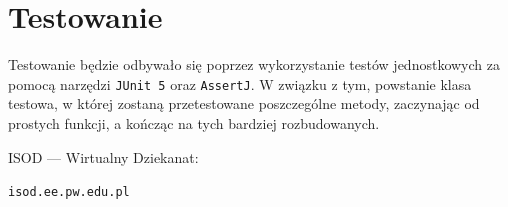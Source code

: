 \documentclass[12pt,a4paper]{article}
\begin{document}
\newpage
\section{Testowanie}
Testowanie będzie odbywało się poprzez wykorzystanie testów jednostkowych za pomocą narzędzi \texttt{JUnit 5} oraz \texttt{AssertJ}. W związku z tym, powstanie klasa testowa, w której zostaną przetestowane poszczególne metody, zaczynając od prostych funkcji, a kończąc na tych bardziej rozbudowanych.

\begin{thebibliography}{1}
ISOD — Wirtualny Dziekanat:

\texttt{isod.ee.pw.edu.pl}
\end{thebibliography}
\end{document}
